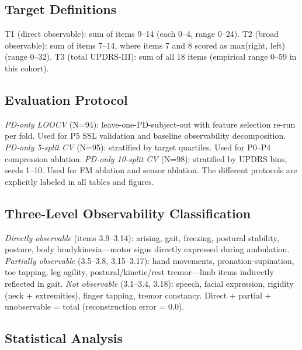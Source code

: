 \documentclass[11pt]{article}
\begin{document}
\subsection{Target Definitions}

T1 (direct observable): sum of items 9--14 (each 0--4, range 0--24). T2 (broad observable): sum of items 7--14, where items 7 and 8 scored as max(right, left) (range 0--32). T3 (total UPDRS-III): sum of all 18 items (empirical range 0--59 in this cohort).

\subsection{Evaluation Protocol}

\emph{PD-only LOOCV} (N=94): leave-one-PD-subject-out with feature selection re-run per fold. Used for P5 SSL validation and baseline observability decomposition. \emph{PD-only 5-split CV} (N=95): stratified by target quartiles. Used for P0--P4 compression ablation. \emph{PD-only 10-split CV} (N=98): stratified by UPDRS bins, seeds 1--10. Used for FM ablation and sensor ablation. The different protocols are explicitly labeled in all tables and figures.

\subsection{Three-Level Observability Classification}

\emph{Directly observable} (items 3.9--3.14): arising, gait, freezing, postural stability, posture, body bradykinesia---motor signs directly expressed during ambulation. \emph{Partially observable} (3.5--3.8, 3.15--3.17): hand movements, pronation-supination, toe tapping, leg agility, postural/kinetic/rest tremor---limb items indirectly reflected in gait. \emph{Not observable} (3.1--3.4, 3.18): speech, facial expression, rigidity (neck + extremities), finger tapping, tremor constancy. Direct + partial + unobservable = total (reconstruction error = 0.0).

\subsection{Statistical Analysis}
\end{document}
